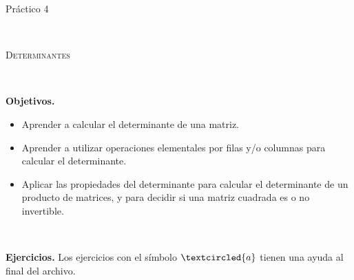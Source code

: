 \documentclass[12pt]{amsart}
\begin{document}
	
	
\centerline{\Large{Pr\' actico 4}}
	
\
	
\centerline{\textsc{Determinantes}}

\

\noindent \textbf{Objetivos.}

\begin{itemize}
\item Aprender a calcular el determinante de una matriz.

\item Aprender a utilizar operaciones elementales por filas y/o columnas para calcular el determinante.

\item Aplicar las propiedades del determinante para calcular el determinante de un producto de matrices, y para decidir si una matriz cuadrada es o no invertible.
\end{itemize}
		
\

\noindent \textbf{Ejercicios.} Los ejercicios con el s\'imbolo $\textcircled{a}$ tienen una ayuda al final del archivo.
\end{document}
